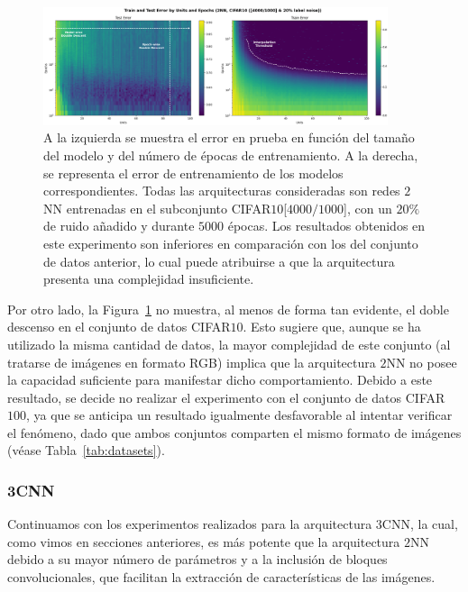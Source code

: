 \begin{figure}[h]
    \centering
    \includegraphics[width=0.9\textwidth]{img/experiments/model-epoch2NNCIFAR10.png}
    \caption[Doble descenso en función del tamaño del modelo y del número de épocas para la red $2$NN y un subconjunto de CIFAR-$10$.]{A la izquierda se muestra el error en prueba en función del tamaño del modelo y del número de épocas de entrenamiento. A la derecha, se representa el error de entrenamiento de los modelos correspondientes. Todas las arquitecturas consideradas son redes $2$NN entrenadas en el subconjunto CIFAR$10$[$4000/1000$], con un $20\%$ de ruido añadido y durante $5000$ épocas. Los resultados obtenidos en este experimento son inferiores en comparación con los del conjunto de datos anterior, lo cual puede atribuirse a que la arquitectura presenta una complejidad insuficiente.
    }\label{fig:model-epoch2NNCIFAR10}
\end{figure}

Por otro lado, la Figura~\ref{fig:model-epoch2NNCIFAR10} no muestra, al menos de forma tan evidente, el doble descenso en el conjunto de datos CIFAR$10$. Esto sugiere que, aunque se ha utilizado la misma cantidad de datos, la mayor complejidad de este conjunto (al tratarse de imágenes en formato RGB) implica que la arquitectura $2$NN no posee la capacidad suficiente para manifestar dicho comportamiento. Debido a este resultado, se decide no realizar el experimento con el conjunto de datos CIFAR$100$, ya que se anticipa un resultado igualmente desfavorable al intentar verificar el fenómeno, dado que ambos conjuntos comparten el mismo formato de imágenes (véase Tabla~\ref{tab:datasets}).\newline

\subsubsection{3CNN}\label{subsubsec:model-epoch-wise-3CNN}

Continuamos con los experimentos realizados para la arquitectura $3$CNN, la cual, como vimos en secciones anteriores, es más potente que la arquitectura $2$NN debido a su mayor número de parámetros y a la inclusión de bloques convolucionales, que facilitan la extracción de características de las imágenes.\newline

